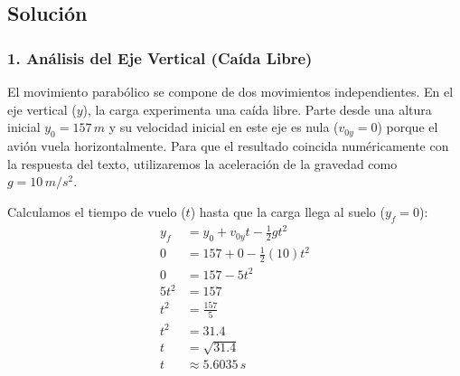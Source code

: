 \documentclass[12pt, a4paper]{article}
\begin{document}
\begin{center}
\end{center}

\subsection*{Solución}

\subsubsection*{1. Análisis del Eje Vertical (Caída Libre)}
El movimiento parabólico se compone de dos movimientos independientes. En el eje vertical ($y$), la carga experimenta una caída libre. Parte desde una altura inicial $y_0 = 157 \, \si{m}$ y su velocidad inicial en este eje es nula ($v_{0y} = 0$) porque el avión vuela horizontalmente.
Para que el resultado coincida numéricamente con la respuesta del texto, utilizaremos la aceleración de la gravedad como $g = 10 \, \si{m/s^2}$.

Calculamos el tiempo de vuelo ($t$) hasta que la carga llega al suelo ($y_f = 0$):
\begin{align*}
y_f &= y_0 + v_{0y}t - \frac{1}{2}gt^2 \\
0 &= 157 + 0 - \frac{1}{2}(10)t^2 \\
0 &= 157 - 5t^2 \\
5t^2 &= 157 \\
t^2 &= \frac{157}{5} \\
t^2 &= 31.4 \\
t &= \sqrt{31.4} \\
t &\approx 5.6035 \, \si{s}
\end{align*}
\end{document}
